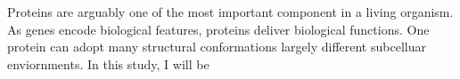 Proteins are arguably one of the most important component in a living organism. As genes encode biological features, proteins deliver biological functions. One protein can adopt many structural conformations largely  different subcelluar enviornments.    In this study, I will be 